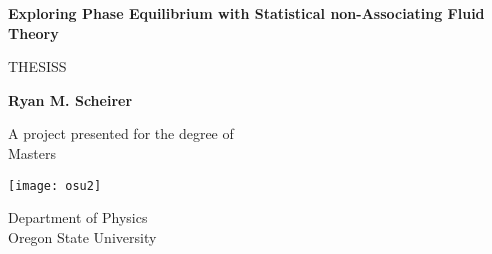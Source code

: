 \begin{titlepage}
	\begin{center}
	\vspace*{1cm}
	
	\Huge
	\textbf{Exploring Phase Equilibrium with Statistical non-Associating Fluid Theory}
	
	\vspace{0.5cm}
	\LARGE
	THESISS
	
	\vspace{1.5cm}
	
	\textbf{Ryan M. Scheirer}
	
	\vfill
	
	A project presented for the degree of\\
	Masters
	
	\vspace{0.8cm}
	
	\texttt{[image: osu2]}
	
	\Large
	Department of Physics\\
	Oregon State University\\
	\date{The date}
	
	\end{center}
\end{titlepage}